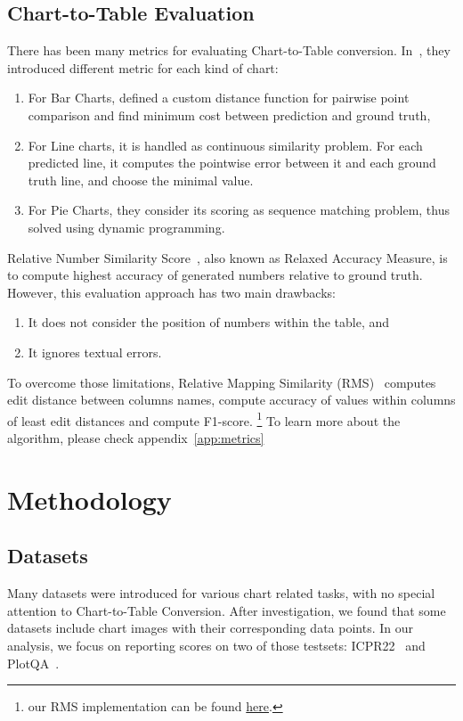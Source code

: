 \documentclass[
	letterpaper, %
]{jdf}
\begin{document}
\subsection{Chart-to-Table Evaluation}\label{ssect:task-evaluation}
There has been many metrics for evaluating Chart-to-Table conversion.
In~\cite{luo2021chartocr}, they introduced different metric for each kind of chart:
\begin{enumerate}
         \item For Bar Charts, defined a custom distance function for pairwise point comparison and find minimum cost between prediction and ground truth,
         \item For Line charts, it is handled as continuous similarity problem.
             For each predicted line, it computes the pointwise error between it and each ground truth line, and choose the minimal value.
         \item For Pie Charts, they consider its scoring as sequence matching problem, thus solved using dynamic programming.
              \end{enumerate}
Relative Number Similarity Score~\cite{masry2022chartqa}, also known as Relaxed Accuracy Measure, is to compute highest accuracy of generated numbers relative to ground truth.
However, this evaluation approach has two main drawbacks:
\begin{enumerate}
         \item It does not consider the position of numbers within the table, and
         \item It ignores textual errors.
              \end{enumerate}
To overcome those limitations, Relative Mapping Similarity (RMS)~\cite{liu2022deplot} computes edit distance between columns names, compute accuracy of values within columns of least edit distances and compute F1-score.
\footnote{our RMS implementation can be found \href{https://github.gatech.edu/mfayed8/GIE-metrics}{here}.}
To learn more about the algorithm, please check appendix~\ref{app:metrics}

\section{Methodology}\label{sect:methodology}
\subsection{Datasets}\label{ssect:datasets}
Many datasets were introduced for various chart related tasks, with no special attention to Chart-to-Table Conversion.
After investigation, we found that some datasets include chart images with their corresponding data points.
In our analysis, we focus on reporting scores on two of those testsets: ICPR22~\cite{rousseau2023pattern} and PlotQA~\cite{methani2020plotqa}.
\end{document}

